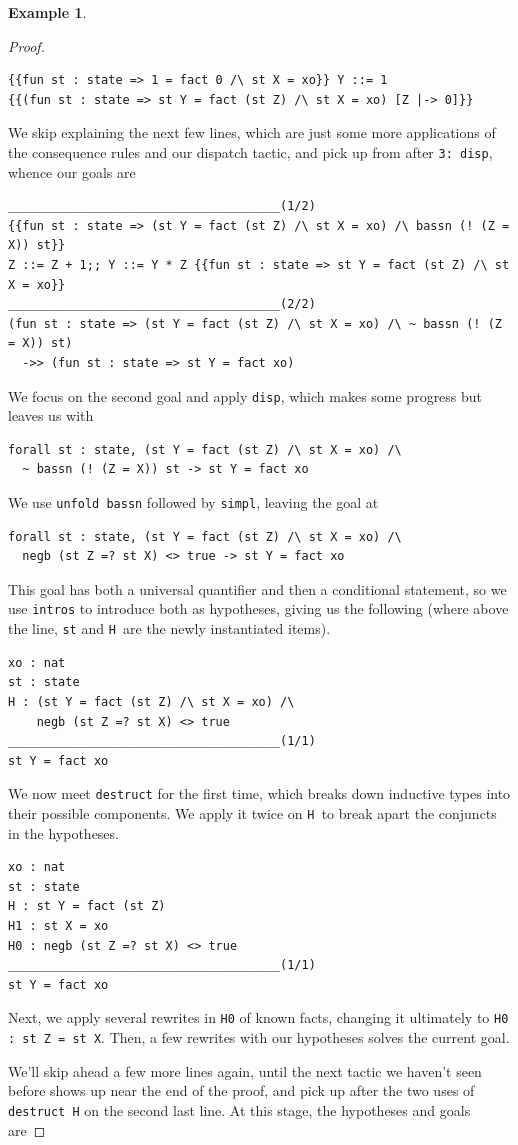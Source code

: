 \documentclass[12pt,notitlepage]{report}
\theoremstyle{plain}
\theoremstyle{definition}
\newtheorem{example}[theo]{Example}
\numberwithin{equation}{section}
\begin{document}
\begin{example}
\begin{proof}
\begin{verbatim}
{{fun st : state => 1 = fact 0 /\ st X = xo}} Y ::= 1
{{(fun st : state => st Y = fact (st Z) /\ st X = xo) [Z |-> 0]}}
\end{verbatim}
We skip explaining the next few lines, which are just some more applications of the consequence rules and our dispatch tactic, and pick up from after \verb$3: disp$, whence our goals are
\begin{verbatim}
______________________________________(1/2)
{{fun st : state => (st Y = fact (st Z) /\ st X = xo) /\ bassn (! (Z = X)) st}}
Z ::= Z + 1;; Y ::= Y * Z {{fun st : state => st Y = fact (st Z) /\ st X = xo}}
______________________________________(2/2)
(fun st : state => (st Y = fact (st Z) /\ st X = xo) /\ ~ bassn (! (Z = X)) st) 
  ->> (fun st : state => st Y = fact xo)
\end{verbatim}
We focus on the second goal and apply \verb$disp$, which makes some progress but leaves us with
\begin{verbatim}
forall st : state, (st Y = fact (st Z) /\ st X = xo) /\
  ~ bassn (! (Z = X)) st -> st Y = fact xo
\end{verbatim}
We use \verb$unfold bassn$ followed by \verb$simpl$, leaving the goal at 
\begin{verbatim}
forall st : state, (st Y = fact (st Z) /\ st X = xo) /\
  negb (st Z =? st X) <> true -> st Y = fact xo
\end{verbatim}
This goal has both a universal quantifier and then a conditional statement, so we use \verb$intros$ to introduce both as hypotheses, giving us the following (where above the line, \verb$st$ and \verb$H $are the newly instantiated items).
\begin{verbatim}
xo : nat
st : state
H : (st Y = fact (st Z) /\ st X = xo) /\
    negb (st Z =? st X) <> true
______________________________________(1/1)
st Y = fact xo
\end{verbatim}
We now meet \verb$destruct$\index{destruct} for the first time, which breaks down inductive types into their possible components.  We apply it twice on \verb$H $to break apart the conjuncts in the hypotheses.
\begin{verbatim}
xo : nat
st : state
H : st Y = fact (st Z)
H1 : st X = xo
H0 : negb (st Z =? st X) <> true
______________________________________(1/1)
st Y = fact xo
\end{verbatim}
Next, we apply several rewrites in \verb$H0$ of known facts, changing it ultimately to \verb$H0 : st Z = st X$.  Then, a few rewrites with our hypotheses solves the current goal.
\par We'll skip ahead a few more lines again, until the next tactic we haven't seen before shows up near the end of the proof, and pick up after the two uses of \verb$destruct H$ on the second last line.  At this stage, the hypotheses and goals are

\end{proof}
\end{example}
\end{document}
